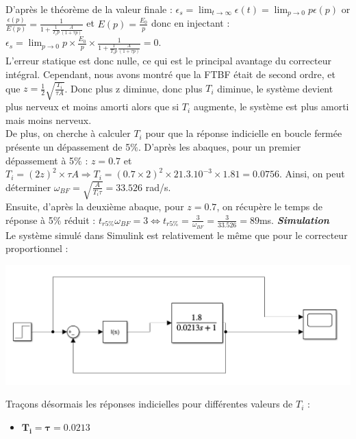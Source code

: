 \documentclass[12pt]{article}
\begin{document}
D'après le théorème de la valeur finale : 
$\epsilon_s = \lim_{t \to \infty}\epsilon(t) = \lim_{p \to 0}p\epsilon(p)$ or $\frac{\epsilon(p)}{E(p)} = \frac{1}{1 + \frac{1}{T_ip}\frac{A}{(1+\tau p)}}$ et $E(p) = \frac{E_0}{p}$ donc en injectant :
$\epsilon_s = \lim_{p \to 0}p \times \frac{E_0}{p}\times \frac{1}{1 + \frac{1}{T_ip}\frac{A}{(1+\tau p)}} = 0$.
\\L'erreur statique est donc nulle, ce qui est le principal avantage du correcteur intégral. Cependant, nous avons montré que la FTBF était de second ordre, et que $z = \frac{1}{2}\sqrt{\frac{T_i}{\tau A}}$. Donc plus z diminue, donc plus $T_i$ diminue, le système devient plus nerveux et moins amorti alors que si $T_i$ augmente, le système est plus amorti mais moins nerveux.
\\De plus, on cherche à calculer $T_i$ pour que la réponse indicielle en boucle fermée présente un dépassement de 5$\%$.
D'après les abaques, pour un premier dépassement à 5$\%$ : $z=0.7$ et $T_i = (2z)^2\times\tau A \Rightarrow T_i = (0.7\times2)^2\times21.3.10^{-3}\times1.81 = 0.0756$.
Ainsi, on peut déterminer $\omega_{BF} = \sqrt{\frac{A}{T_i \tau}} = 33.526$ rad/s.
\\Ensuite, d'après la deuxième abaque, pour $z=0.7$, on récupère le temps de réponse à 5$\%$ réduit :
$t_{r5\%}\omega_{BF} = 3 \Leftrightarrow t_{r5\%} = \frac{3}{\omega_{BF}} = \frac{3}{33.526} = 89$ms.
\newpage
\Large \textit{ \textbf{Simulation}}
\\\normalsize Le système simulé dans Simulink est relativement le même que pour le correcteur proportionnel : 
\begin{center}
    \includegraphics[width = 15 cm]{TP2 Simulink/Syst_1/Syst1_Simulink_I.png}
\end{center}

Traçons désormais les réponses indicielles pour différentes valeurs de $T_i$ : 
\begin{itemize}
    \item \large $\mathbf{T_i = \tau = 0.0213}$
\end{itemize}
\end{document}
